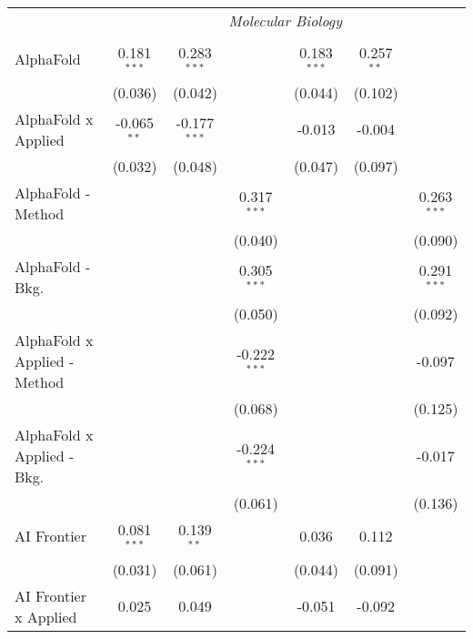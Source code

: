 \begin{tabular}{lcccccc}
 & \multicolumn{6}{c}{\textit{Molecular Biology}} \\ \\
   AlphaFold                      & 0.181$^{***}$ & 0.283$^{***}$  &                & 0.183$^{***}$ & 0.257$^{**}$  &   \\   
                                  & (0.036)       & (0.042)        &                & (0.044)       & (0.102)       &   \\   
   AlphaFold x Applied            & -0.065$^{**}$ & -0.177$^{***}$ &                & -0.013        & -0.004        &   \\   
                                  & (0.032)       & (0.048)        &                & (0.047)       & (0.097)       &   \\   
   AlphaFold - Method             &               &                & 0.317$^{***}$  &               &               & 0.263$^{***}$\\   
                                  &               &                & (0.040)        &               &               & (0.090)\\   
   AlphaFold - Bkg.               &               &                & 0.305$^{***}$  &               &               & 0.291$^{***}$\\   
                                  &               &                & (0.050)        &               &               & (0.092)\\   
   AlphaFold x Applied - Method   &               &                & -0.222$^{***}$ &               &               & -0.097\\   
                                  &               &                & (0.068)        &               &               & (0.125)\\   
   AlphaFold x Applied - Bkg.     &               &                & -0.224$^{***}$ &               &               & -0.017\\   
                                  &               &                & (0.061)        &               &               & (0.136)\\   
   AI Frontier                    & 0.081$^{***}$ & 0.139$^{**}$   &                & 0.036         & 0.112         &   \\   
                                  & (0.031)       & (0.061)        &                & (0.044)       & (0.091)       &   \\   
   AI Frontier x Applied          & 0.025         & 0.049          &                & -0.051        & -0.092        &   \\   

\end{tabular}
